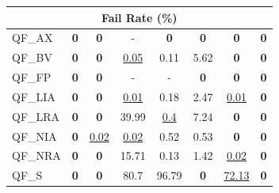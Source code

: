 \begin{table}[hp]
{\begin{tabular}{lccccccc}
\multicolumn{8}{c}{\textbf{Fail Rate (\%)}} \\
\midrule
QF\_AX  & \textbf{0} & \textbf{0} & - & \textbf{0} & \textbf{0} & \textbf{0} & \textbf{0} \\
QF\_BV  & \textbf{0} & \textbf{0} & \underline{0.05} & 0.11 & 5.62 & \textbf{0} & \textbf{0} \\
QF\_FP  & \textbf{0} & \textbf{0} & - & - & \textbf{0} & \textbf{0} & \textbf{0} \\
QF\_LIA  & \textbf{0} & \textbf{0} & \underline{0.01} & 0.18 & 2.47 & \underline{0.01} & \textbf{0} \\
QF\_LRA  & \textbf{0} & \textbf{0} & 39.99 & \underline{0.4} & 7.24 & \textbf{0} & \textbf{0} \\
QF\_NIA  & \textbf{0} & \underline{0.02} & \underline{0.02} & 0.52 & 0.53 & \textbf{0} & \textbf{0} \\
QF\_NRA  & \textbf{0} & \textbf{0} & 15.71 & 0.13 & 1.42 & \underline{0.02} & \textbf{0} \\
QF\_S  & \textbf{0} & \textbf{0} & 80.7 & 96.79 & \textbf{0} & \underline{72.13} & \textbf{0} \\
\bottomrule
\end{tabular}%
}
\end{table}